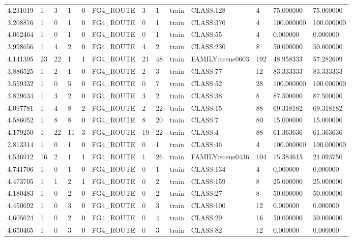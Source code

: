 \begin{tabular}{lllllllllllll}
4.231019 & 1 & 3 & 1 & 0 & FG4\_ROUTE & 3 & 1 & train & CLASS:128 & 4 & 75.000000 & 75.000000 \\
3.208876 & 1 & 0 & 1 & 0 & FG4\_ROUTE & 0 & 1 & train & CLASS:370 & 4 & 100.000000 & 100.000000 \\
4.062464 & 1 & 0 & 1 & 0 & FG4\_ROUTE & 0 & 1 & train & CLASS:55 & 4 & 0.000000 & 0.000000 \\
3.998656 & 1 & 4 & 2 & 0 & FG4\_ROUTE & 4 & 2 & train & CLASS:230 & 8 & 50.000000 & 50.000000 \\
4.141395 & 23 & 22 & 1 & 1 & FG4\_ROUTE & 21 & 48 & train & FAMILY:scene0603 & 192 & 48.958333 & 57.282609 \\
3.886525 & 1 & 2 & 1 & 0 & FG4\_ROUTE & 2 & 3 & train & CLASS:77 & 12 & 83.333333 & 83.333333 \\
3.559332 & 1 & 0 & 5 & 0 & FG4\_ROUTE & 0 & 7 & train & CLASS:52 & 28 & 100.000000 & 100.000000 \\
3.829634 & 1 & 3 & 2 & 0 & FG4\_ROUTE & 3 & 2 & train & CLASS:38 & 8 & 87.500000 & 87.500000 \\
4.097781 & 1 & 4 & 8 & 2 & FG4\_ROUTE & 2 & 22 & train & CLASS:15 & 88 & 69.318182 & 69.318182 \\
4.586052 & 1 & 8 & 8 & 0 & FG4\_ROUTE & 8 & 20 & train & CLASS:7 & 80 & 15.000000 & 15.000000 \\
4.179250 & 1 & 22 & 11 & 3 & FG4\_ROUTE & 19 & 22 & train & CLASS:4 & 88 & 61.363636 & 61.363636 \\
2.813314 & 1 & 0 & 1 & 0 & FG4\_ROUTE & 0 & 1 & train & CLASS:46 & 4 & 100.000000 & 100.000000 \\
4.536912 & 16 & 2 & 1 & 1 & FG4\_ROUTE & 1 & 26 & train & FAMILY:scene0436 & 104 & 15.384615 & 21.093750 \\
4.741706 & 1 & 0 & 1 & 0 & FG4\_ROUTE & 0 & 1 & train & CLASS:134 & 4 & 0.000000 & 0.000000 \\
4.473705 & 1 & 1 & 2 & 1 & FG4\_ROUTE & 0 & 2 & train & CLASS:159 & 8 & 25.000000 & 25.000000 \\
4.180483 & 1 & 0 & 2 & 0 & FG4\_ROUTE & 0 & 2 & train & CLASS:27 & 8 & 50.000000 & 50.000000 \\
4.450692 & 1 & 0 & 3 & 0 & FG4\_ROUTE & 0 & 3 & train & CLASS:100 & 12 & 0.000000 & 0.000000 \\
4.605624 & 1 & 0 & 2 & 0 & FG4\_ROUTE & 0 & 4 & train & CLASS:29 & 16 & 50.000000 & 50.000000 \\
4.650465 & 1 & 0 & 3 & 0 & FG4\_ROUTE & 0 & 3 & train & CLASS:82 & 12 & 0.000000 & 0.000000 \\

\end{tabular}
